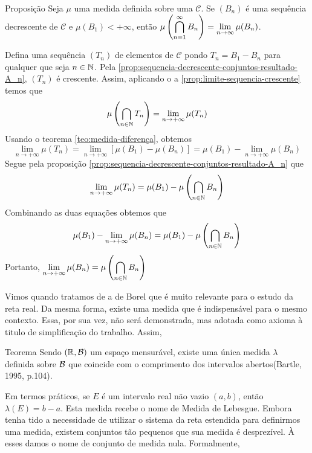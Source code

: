 \begin{env}{Proposição}
Seja $\mu$ uma medida definida sobre uma \sigal $\mathcal{C}$.
Se $(B_n)$ é uma sequência decrescente de $\mathcal{C}$ e $\mu(B_1) < +\infty$, então 
$\mu\left(\displaystyle \bigcap_{n = 1}^\infty B_n\right) = \displaystyle \lim_{n \to \infty} \mu(B_n)$.
\end{env} 
\begin{prova}
    Defina uma sequência $(T_n)$ de elementos de $\mathcal{C}$ pondo $T_n = B_1 - B_n$ para qualquer que seja $n \in \operatorname{\mathbb{N}}$.
    Pela \ref{prop:sequencia-decrescente-conjuntos-resultado-A_n}, $(T_n)$ é crescente.
    Assim, aplicando o a \ref{prop:limite-sequencia-crescente} temos que 
    $$
    \mu\left(\bigcap_{n \in \operatorname{\mathbb{N}}} T_n\right) = \lim_{n \to +\infty} \mu(T_n)
    $$
    Usando o teorema \ref{teo:medida-diferença}, obtemos
    $$
    \lim_{n \to +\infty} \mu(T_n) = \lim_{n \to +\infty} [\mu(B_1) - \mu(B_n)] = \mu(B_1) - \lim_{n \to +\infty} \mu(B_n)
    $$
    Segue pela proposição \ref{prop:sequencia-decrescente-conjuntos-resultado-A_n} que 
    $$
    \lim_{n \to +\infty} \mu(T_n) = \mu(B_1) - \mu\left(\bigcap_{n \in \operatorname{\mathbb{N}}} B_n\right)
    $$
    Combinando as duas equações obtemos que
    \begin{align*}
        \mu(B_1) - \lim_{n \to +\infty} \mu(B_n) = \mu(B_1) - \mu\left(\bigcap_{n \in \operatorname{\mathbb{N}}} B_n\right)
    \end{align*}
    Portanto, $\displaystyle \lim_{n \to +\infty} \mu(B_n) = \mu\left(\bigcap_{n \in \operatorname{\mathbb{N}}} B_n\right)$
\end{prova}

Vimos quando tratamos de \sigals a \sigal de Borel que é muito relevante para o estudo da reta real.
Da mesma forma, existe uma medida que é indispensável para o mesmo contexto.
Essa, por sua vez, não será demonstrada, mas adotada como axioma à titulo de simplificação do trabalho.
Assim, 

\begin{env}{Teorema}
	\label{teo: medida de lebesgue}
	Sendo $(\mathbb{R}, \operatorname{\mathcal{B}})$ um espaço mensurável, existe uma única medida $\lambda$ definida sobre $\operatorname{\mathcal{B}}$ que coincide com o comprimento dos intervalos abertos(Bartle, 1995, p.104).
\end{env}

Em termos práticos, se $E$ é um intervalo real não vazio $(a,b)$, então $\lambda(E) = b - a$.
Esta medida recebe o nome de Medida de Lebesgue. 
Embora tenha tido a necessidade de utilizar o sistema da reta estendida para definirmos uma medida, existem conjuntos tão pequenos que sua medida é desprezível.
À esses damos o nome de conjunto de medida nula.
Formalmente,

